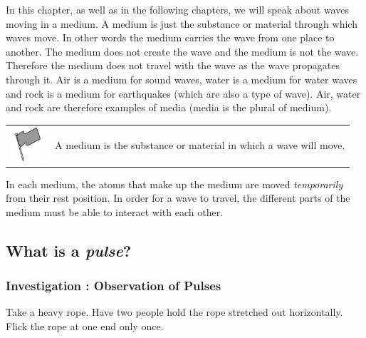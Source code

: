       
      \label{m38801*id312816}In this chapter, as well as in the following chapters, we will speak about waves moving in a medium. A medium is just the substance or material through which waves move. In other words the medium carries the wave from one place to another. The medium does not create the wave and the medium is not the wave. Therefore the medium does not travel with the wave as the wave propagates through it. Air is a medium for sound waves, water is a medium for water waves and rock is a medium for earthquakes (which are also a type of wave). Air, water and rock are therefore examples of media (media is the plural of medium).\par 
\label{m38801*fhsst!!!underscore!!!id51}\begin{definition}
	  \begin{tabular*}{15 cm}{m{15 mm}m{}}
	\hspace*{-50pt}  \includegraphics[width=0.5in]{col11305.imgs/psflag2.png}   & \Definition{   \label{id2434692}\textbf{ Medium }} { \label{m38801*meaningfhsst!!!underscore!!!id51}
      \label{m38801*id312830}A medium is the substance or material in which a wave will move. \par 
       } 
      \end{tabular*}
      \end{definition}

      \label{m38801*id312841}In each medium, the atoms that make up the medium are moved \textsl{temporarily} from their rest position. In order for a wave to travel, the different parts of the medium must be able to interact with each other.\par 
    
    \label{m38801*cid4}
            \subsection{ What is a \textsl{pulse}?}
            \nopagebreak
            \label{m38801*secfhsst!!!underscore!!!id58}
            \subsubsection{  Investigation : Observation of Pulses }
            \nopagebreak
            
      \label{m38801*id312873}Take a heavy rope. Have two people hold the rope stretched out horizontally. Flick the rope at one end only once.\par 
      \label{m38801*id312879}
        
